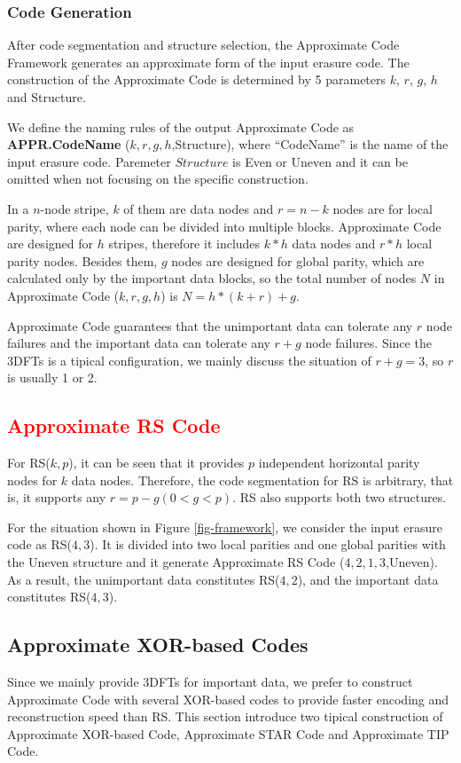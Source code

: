 \documentclass[sigconf]{acmart}
\begin{document}
\subsubsection{Code Generation}\label{code-gen}
After code segmentation and structure selection, the Approximate Code Framework generates an approximate form of the input erasure code.
The construction of the Approximate Code is determined by 5 parameters $k$, $r$, $g$, $h$ and Structure.

We define the naming rules of the output Approximate Code as \textbf{APPR.CodeName} ($k,r,g,h$,Structure), where ``CodeName'' is the name of the input erasure code. Paremeter $Structure$ is Even or Uneven and it can be omitted when not focusing on the specific construction.

In a $n$-node stripe, $k$ of them are data nodes and $r=n-k$ nodes are for local parity, where each node can be divided into multiple blocks.
Approximate Code are designed for $h$ stripes, therefore it includes $k*h$ data nodes and $r*h$ local parity nodes.
Besides them, $g$ nodes are designed for global parity, which are calculated only by the important data blocks, so the total number of nodes $N$ in Approximate Code ($k,r,g,h$) is
$N= h*(k+r) + g$.

Approximate Code guarantees that the unimportant data can tolerate any $r$ node failures and the important data can tolerate any $r+g$ node failures.
Since the 3DFTs is a tipical configuration, we mainly discuss the situation of $r+g=3$, so $r$ is usually 1 or 2.

\subsection{\textcolor{red}{Approximate RS Code}}
For RS($k,p$), it can be seen that it provides $p$ independent horizontal parity nodes for $k$ data nodes. Therefore, the code segmentation for RS is arbitrary, that is, it supports any $r=p-g(0<g<p)$. RS also supports both two structures.

For the situation shown in Figure \ref{fig-framework}, we consider the input erasure code as RS($4,3$). It is divided into two local parities and one global parities with the Uneven structure and it generate Approximate RS Code ($4,2,1,3$,Uneven).
As a result, the unimportant data constitutes RS($4,2$), and the important data constitutes RS($4,3$).


\subsection{Approximate XOR-based Codes}
Since we mainly provide 3DFTs for important data, we prefer to construct Approximate Code with several XOR-based codes to provide faster encoding and reconstruction speed than RS. This section introduce two tipical construction of Approximate XOR-based Code, Approximate STAR Code and Approximate TIP Code.
\end{document}
